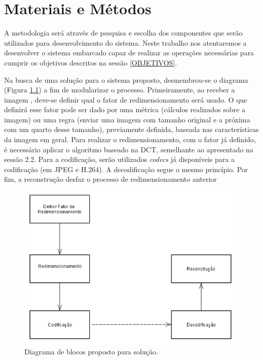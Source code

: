 \chapter[Materiais e Métodos]{Materiais e Métodos}

A metodologia será através de pesquisa e escolha dos componentes que serão utilizados para desenvolvimento do sistema. Neste trabalho nos atentaremos a desenvolver o sistema embarcado capaz de realizar as operações necessárias para cumprir os objetivos descritos na sessão \ref{OBJETIVOS}.

Na busca de uma solução para o sistema proposto, desmembrou-se o diagrama (Figura \ref{fig:blocos}) a fim de modularizar o processo. Primeiramente, ao receber a imagem , deve-se definir qual o fator de redimensionamento será usado. O que definirá esse fator pode ser dado por uma métrica (cálculos realizados sobre a imagem) ou uma regra (enviar uma imagem com tamanho original e a próxima com um quarto desse tamanho), previamente definida, baseada nas características da imagem em geral. Para realizar o redimensionamento, com o fator já definido, é necessário aplicar o algoritmo baseado na DCT, semelhante ao apresentado na sessão 2.2. Para a codificação, serão utilizados \textit{codecs} já disponíveis para a codificação (em JPEG e H.264). A decodificação segue o mesmo princípio. Por fim, a reconstrução desfaz o processo de redimensionamento anterior

\begin{figure}[h]
	\centering
	\includegraphics[scale=.8]{figuras/BLOCOS.png}
	\caption{Diagrama de blocos proposto para solução.}
	\label{fig:blocos}
\end{figure}

